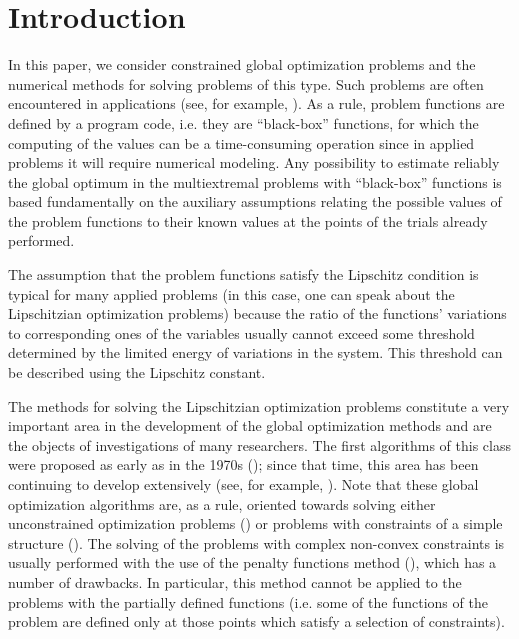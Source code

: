 \documentclass[twocolumn]{svjour3}          %
\begin{document}
\section{Introduction}
\label{intro}
In this paper, we consider constrained global optimization problems and the numerical methods for solving problems of this type. Such problems are often encountered in applications (see, for example, \cite{Pinter2006}). As a rule, problem functions are defined by a program code, i.e. they are ``black-box'' functions, for which the computing of the values can be a time-consuming operation since in applied problems it will require  numerical modeling. Any  possibility to estimate reliably the global optimum in the multiextremal problems with ``black-box'' functions is based fundamentally on the auxiliary assumptions relating the possible values of the problem functions to their known values at the points of the trials already performed.
	
	The assumption that the problem functions satisfy the Lipschitz condition is typical for many applied problems (in this case, one can speak about the Lipschitzian optimization problems) because the ratio of the functions’ variations to corresponding ones of the variables usually cannot exceed some threshold determined by the limited energy of variations in the system. This threshold can be described using the Lipschitz constant.
	
	The methods for solving the Lipschitzian optimization problems constitute a very important area in the development of the global optimization methods and are the objects of investigations of many researchers. The first algorithms of this class were proposed as early as in the 1970s (\cite{Evtushenko1971,Piyavskii1972,Shubert1972,Strongin1970}); since that time, this area has been continuing to develop extensively (see, for example, \cite{Evtushenko2009,Evtushenko2013,Strongin2000,Sergeyev2013,Jones2009}). Note that these global optimization algorithms are, as a rule, oriented towards solving either  unconstrained optimization problems \break (\cite{Paulavicius2014,Sergeyev2015,Pinter1996,Jones1993,Gablonsky2001}) or problems with constraints of a simple structure (\cite{Vaz2009,Paulavicius2016}). The solving of the problems with complex non-convex constraints is usually performed with the use of the penalty functions method (\cite{Stripinis2019,Pillo2012,Pillo2016}), which has a number of drawbacks.  In particular, this method cannot be applied to the problems with the partially defined functions (i.e. some of the functions of the problem are defined only at those points which satisfy a selection of constraints).
	
\end{document}

